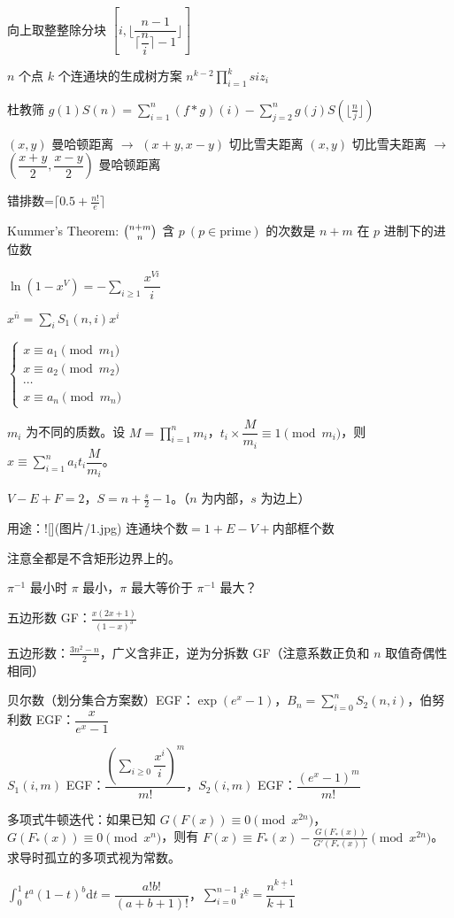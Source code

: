 \documentclass{ctexart}
\begin{document}
向上取整整除分块 $[i,\lfloor\dfrac{n-1}{\lceil\dfrac ni \rceil-1}\rfloor]$

$n$ 个点 $k$ 个连通块的生成树方案 $n^{k-2}\prod\limits_{i=1}^k siz_i$

杜教筛 $g(1)S(n)=\sum\limits_{i=1}^n(f*g)(i)-\sum\limits_{j=2}^ng(j)S(\lfloor\frac nj\rfloor)$

$(x,y)$ 曼哈顿距离 $\to$ $(x+y,x-y)$ 切比雪夫距离  
$(x,y)$ 切比雪夫距离 $\to$ $(\dfrac{x+y}{2},\dfrac{x-y}{2})$ 曼哈顿距离

错排数=$\lceil0.5+\frac{n!}{e}\rceil$

Kummer's Theorem: $\tbinom{n+m}{n}$ 含 $p~(p\in \text {prime})$ 的次数是 $n+m$ 在 $p$ 进制下的进位数

$\ln (1-x^V)=-\sum\limits_{i\ge1}\dfrac{x^{Vi}}{i}$

$x^{\bar n}=\sum\limits_i S_1(n,i)x^i$

$\begin{cases}x\equiv a_1\pmod {m_1}\\x\equiv a_2\pmod {m_2}\\\cdots\\x\equiv a_n\pmod {m_n}\end{cases}$ 

$m_i$ 为不同的质数。设 $M=\prod\limits_{i=1}^nm_i$，$t_i\times \dfrac {M}{m_i}\equiv 1\pmod {m_i}$，则 $x\equiv \sum\limits_{i=1}^na_it_i\dfrac {M}{m_i}$。

$V-E+F=2$，$S=n+\frac s2-1$。（$n$ 为内部，$s$ 为边上）

用途：![](图片/1.jpg) $\text{连通块个数}=1+E-V+内部框个数$

注意全都是不含矩形边界上的。

$\pi^{-1}$ 最小时 $\pi$ 最小，$\pi$ 最大等价于 $\pi^{-1}$ 最大？

五边形数 GF：$\frac{x(2x+1)}{(1-x)^3}$

五边形数：$\frac{3n^2-n}2$，广义含非正，逆为分拆数 GF（注意系数正负和 $n$ 取值奇偶性相同）

贝尔数（划分集合方案数）EGF：$\exp(e^x-1)$，$B_n=\sum\limits_{i=0}^n S_2(n,i)$，伯努利数 EGF：$\dfrac{x}{e^x-1}$

$S_1(i,m)$ EGF：$\dfrac{(\sum\limits_{i\ge 0}\dfrac{x^i}i)^m}{m!}$，$S_2(i,m)$ EGF：$\dfrac{(e^x-1)^m}{m!}$

多项式牛顿迭代：如果已知 $G(F(x))\equiv0\pmod{x^{2n}}$，$G(F_*(x))\equiv0\pmod {x^n}$，则有 $F(x)\equiv F_*(x)-\frac{G(F_*(x))}{G'(F_*(x))}\pmod{x^{2n}}$。求导时孤立的多项式视为常数。

$\int_0^1 t^a(1-t)^b\mathrm{d}t=\dfrac{a!b!}{(a+b+1)!}$，$\sum\limits_{i=0}^{n-1}i^{\underline{k}}=\dfrac{n^{\underline{k+1}}}{k+1}$
\end{document}
